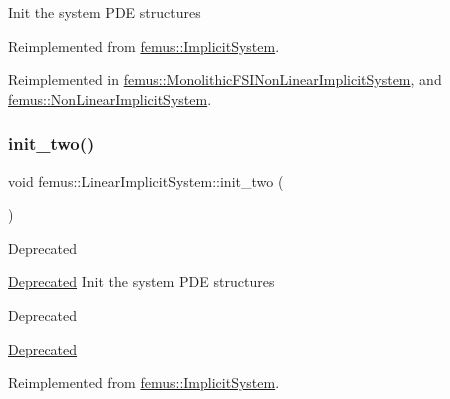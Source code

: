 Init the system P\+DE structures 

Reimplemented from \mbox{\hyperlink{classfemus_1_1_implicit_system_a098b8d66e167a03759ca089bf0f0dc11}{femus\+::\+Implicit\+System}}.



Reimplemented in \mbox{\hyperlink{classfemus_1_1_monolithic_f_s_i_non_linear_implicit_system_a07e04a8cce138cae9edcdd05fd1c7829}{femus\+::\+Monolithic\+F\+S\+I\+Non\+Linear\+Implicit\+System}}, and \mbox{\hyperlink{classfemus_1_1_non_linear_implicit_system_ad2d20975e0c919a9d99bdd9368a0212a}{femus\+::\+Non\+Linear\+Implicit\+System}}.

\mbox{\label{classfemus_1_1_linear_implicit_system_a821e5e01d07a2124ff6f0130f67b5ba6}} 
\subsubsection{\texorpdfstring{init\+\_\+two()}{init\_two()}}
{\footnotesize\ttfamily void femus\+::\+Linear\+Implicit\+System\+::init\+\_\+two (\begin{DoxyParamCaption}{ }\end{DoxyParamCaption})\hspace{0.3cm}{\ttfamily [virtual]}}

\begin{DoxyRefDesc}{Deprecated}
\item[\mbox{\hyperlink{deprecated__deprecated000011}{Deprecated}}]Init the system P\+DE structures \end{DoxyRefDesc}


\begin{DoxyRefDesc}{Deprecated}
\item[\mbox{\hyperlink{deprecated__deprecated000010}{Deprecated}}]\end{DoxyRefDesc}


Reimplemented from \mbox{\hyperlink{classfemus_1_1_implicit_system_a544e5b2b89fd2f8497b3ca6befce74d1}{femus\+::\+Implicit\+System}}.

\mbox{\label{classfemus_1_1_linear_implicit_system_a134831cc5db720540ecafc6382cb7b7d}} 
